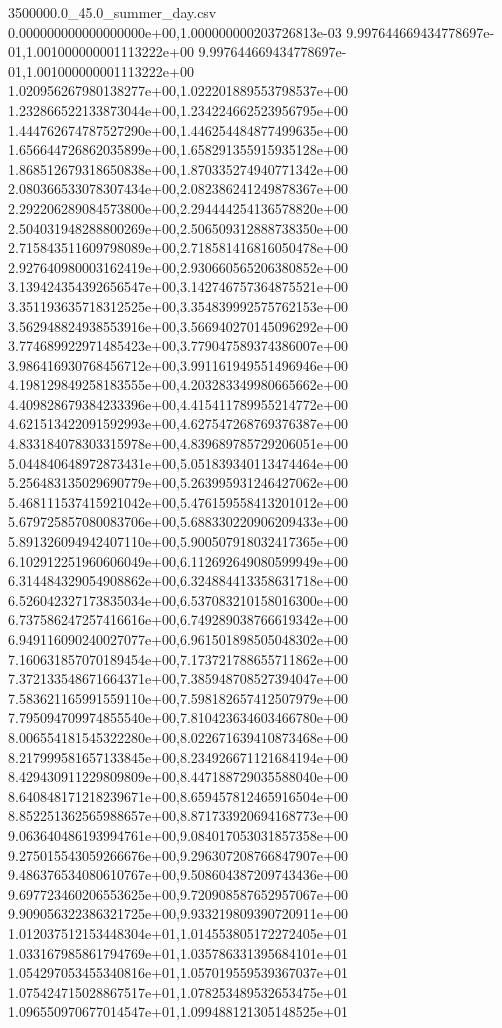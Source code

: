 \begin{filecontents*}{3500000.0_45.0_summer_day.csv}
0.000000000000000000e+00,1.000000000203726813e-03
9.997644669434778697e-01,1.001000000001113222e+00
9.997644669434778697e-01,1.001000000001113222e+00
1.020956267980138277e+00,1.022201889553798537e+00
1.232866522133873044e+00,1.234224662523956795e+00
1.444762674787527290e+00,1.446254484877499635e+00
1.656644726862035899e+00,1.658291355915935128e+00
1.868512679318650838e+00,1.870335274940771342e+00
2.080366533078307434e+00,2.082386241249878367e+00
2.292206289084573800e+00,2.294444254136578820e+00
2.504031948288800269e+00,2.506509312888738350e+00
2.715843511609798089e+00,2.718581416816050478e+00
2.927640980003162419e+00,2.930660565206380852e+00
3.139424354392656547e+00,3.142746757364875521e+00
3.351193635718312525e+00,3.354839992575762153e+00
3.562948824938553916e+00,3.566940270145096292e+00
3.774689922971485423e+00,3.779047589374386007e+00
3.986416930768456712e+00,3.991161949551496946e+00
4.198129849258183555e+00,4.203283349980665662e+00
4.409828679384233396e+00,4.415411789955214772e+00
4.621513422091592993e+00,4.627547268769376387e+00
4.833184078303315978e+00,4.839689785729206051e+00
5.044840648972873431e+00,5.051839340113474464e+00
5.256483135029690779e+00,5.263995931246427062e+00
5.468111537415921042e+00,5.476159558413201012e+00
5.679725857080083706e+00,5.688330220906209433e+00
5.891326094942407110e+00,5.900507918032417365e+00
6.102912251960606049e+00,6.112692649080599949e+00
6.314484329054908862e+00,6.324884413358631718e+00
6.526042327173835034e+00,6.537083210158016300e+00
6.737586247257416616e+00,6.749289038766619342e+00
6.949116090240027077e+00,6.961501898505048302e+00
7.160631857070189454e+00,7.173721788655711862e+00
7.372133548671664371e+00,7.385948708527394047e+00
7.583621165991559110e+00,7.598182657412507979e+00
7.795094709974855540e+00,7.810423634603466780e+00
8.006554181545322280e+00,8.022671639410873468e+00
8.217999581657133845e+00,8.234926671121684194e+00
8.429430911229809809e+00,8.447188729035588040e+00
8.640848171218239671e+00,8.659457812465916504e+00
8.852251362565988657e+00,8.871733920694168773e+00
9.063640486193994761e+00,9.084017053031857358e+00
9.275015543059266676e+00,9.296307208766847907e+00
9.486376534080610767e+00,9.508604387209743436e+00
9.697723460206553625e+00,9.720908587652957067e+00
9.909056322386321725e+00,9.933219809390720911e+00
1.012037512153448304e+01,1.014553805172272405e+01
1.033167985861794769e+01,1.035786331395684101e+01
1.054297053455340816e+01,1.057019559539367037e+01
1.075424715028867517e+01,1.078253489532653475e+01
1.096550970677014547e+01,1.099488121305148525e+01

\end{filecontents*}

